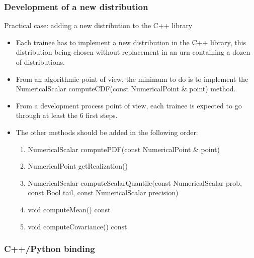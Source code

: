 \documentclass[8pt]{beamer}
\begin{document}
\begin{frame}
  \frametitle{Development of a new distribution}
  \begin{block}{Practical case: adding a new distribution to the C++ library}
    \begin{itemize}
    \item Each trainee has to implement a new distribution in the C++ library, this distribution being chosen without replacement in an urn containing a dozen of distributions.
    \item From an algorithmic point of view, the minimum to do is to implement the {\ttfamily NumericalScalar computeCDF(const NumericalPoint \& point)} method.
    \item From a development process point of view, each trainee is expected to go through at least the 6 first steps.
    \item The other methods should be added in the following order:
      \begin{enumerate}
      \item {\ttfamily NumericalScalar computePDF(const NumericalPoint \& point)}
      \item {\ttfamily NumericalPoint getRealization()}
      \item {\ttfamily NumericalScalar computeScalarQuantile(const NumericalScalar prob, const Bool tail, const NumericalScalar precision)}
      \item {\ttfamily void computeMean() const}
      \item {\ttfamily void computeCovariance() const}
      \end{enumerate}
    \end{itemize}
  \end{block}
\end{frame}


\begin{frame}
  \frametitle{C++/Python binding}
  \tableofcontents[part=1]
\end{frame}
\end{document}
